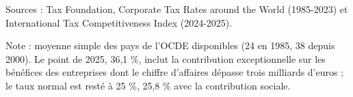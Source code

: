 Sources : Tax Foundation, Corporate Tax Rates around the World (1985-2023) et International Tax Competitiveness Index (2024-2025).\par Note : moyenne simple des pays de l'OCDE disponibles (24 en 1985, 38 depuis 2000). Le point de 2025, 36,1 \%, inclut la contribution exceptionnelle sur les bénéfices des entreprises dont le chiffre d'affaires dépasse trois milliards d'euros ; le taux normal est resté à 25 \%, 25,8 \% avec la contribution sociale.
